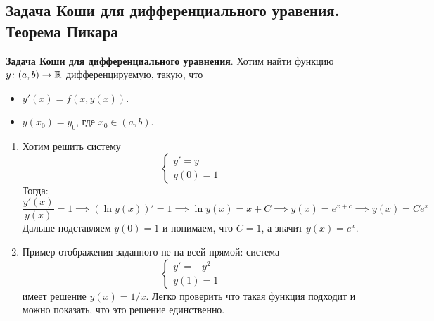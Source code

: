 \subsection{Задача Коши для дифференциального уравения. Теорема Пикара}
\begin{conj}
\textbf{Задача Коши для дифференциального уравнения}. Хотим найти функцию $y\colon (a, b) \to \mathbb{R}$ дифференцируемую, такую, что
\begin{itemize}
    \item $y'(x) = f(x, y(x))$.
    \item $y(x_0) = y_0$, где $x_0 \in (a, b)$.
\end{itemize}
\end{conj}

\begin{examples}
\begin{enumerate}
    \item
    Хотим решить систему
    \begin{equation*}
    \begin{cases}
        y' = y \\
        y(0) = 1
    \end{cases}
    \end{equation*}
    Тогда:
    \begin{equation*}
    \frac{y'(x)}{y(x)} = 1 \implies (\ln y(x))' = 1 \implies \ln y(x) = x + C \implies y(x) = e^{x + c} \implies y(x) = Ce^x
    \end{equation*}
    Дальше подставляем $y(0) = 1$ и понимаем, что $C = 1$, а значит $y(x) = e^x$.

    \item
    Пример отображения заданного не на всей прямой: система
    \begin{equation*}
    \begin{cases}
        y' = -y^2 \\
        y(1) = 1
    \end{cases}
    \end{equation*}
    имеет решение $y(x) = 1/x$. Легко проверить что такая функция подходит и можно показать, что это решение единственно.
\end{enumerate}
\end{examples}

